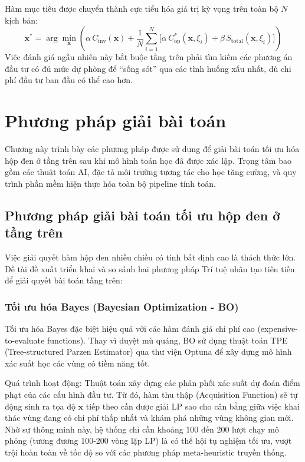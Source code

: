 Hàm mục tiêu được chuyển thành cực tiểu hóa giá trị kỳ vọng trên toàn bộ $N$ kịch bản:
\begin{equation}
    \mathbf{x}^* = \arg\min_{\mathbf{x}} \left( \alpha \, C_{\text{inv}}(\mathbf{x}) + \frac{1}{N} \sum_{i=1}^N \Big[ \alpha \, C_{\text{op}}^*(\mathbf{x}, \xi_i) + \beta \, S_{\text{total}}(\mathbf{x}, \xi_i) \Big] \right)
\end{equation}
Việc đánh giá ngẫu nhiên này bắt buộc tầng trên phải tìm kiếm các phương án đầu tư có đủ mức dự phòng để ``sống sót'' qua các tình huống xấu nhất, dù chi phí đầu tư ban đầu có thể cao hơn.

\chapter{Phương pháp giải bài toán}
\label{chap:solution-method}

Chương này trình bày các phương pháp được sử dụng để giải bài toán tối ưu hóa hộp đen ở tầng trên sau khi mô hình toán học đã được xác lập. Trọng tâm bao gồm các thuật toán AI, đặc tả môi trường tương tác cho học tăng cường, và quy trình phần mềm hiện thực hóa toàn bộ pipeline tính toán.

\section{Phương pháp giải bài toán tối ưu hộp đen ở tầng trên}

Việc giải quyết hàm hộp đen nhiều chiều có tính bất định cao là thách thức lớn. Đề tài đề xuất triển khai và so sánh hai phương pháp Trí tuệ nhân tạo tiên tiến để giải quyết bài toán tầng trên:

\subsection{Tối ưu hóa Bayes (Bayesian Optimization - BO)}
Tối ưu hóa Bayes đặc biệt hiệu quả với các hàm đánh giá chi phí cao (expensive-to-evaluate functions). Thay vì duyệt mù quáng, BO sử dụng thuật toán TPE (Tree-structured Parzen Estimator) qua thư viện Optuna để xây dựng mô hình xác suất học các vùng có tiềm năng tốt.

Quá trình hoạt động: Thuật toán xây dựng các phân phối xác suất dự đoán điểm phạt của các cấu hình đầu tư. Từ đó, hàm thu thập (Acquisition Function) sẽ tự động sinh ra tọa độ $\mathbf{x}$ tiếp theo cần được giải LP sao cho cân bằng giữa việc khai thác vùng đang có chi phí thấp nhất và khám phá những vùng không gian mới. Nhờ sự thông minh này, hệ thống chỉ cần khoảng 100 đến 200 lượt chạy mô phỏng (tương đương 100-200 vòng lặp LP) là có thể hội tụ nghiệm tối ưu, vượt trội hoàn toàn về tốc độ so với các phương pháp meta-heuristic truyền thống.

